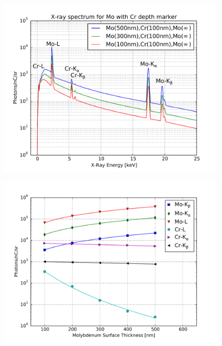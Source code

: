 \documentclass[12pt,letterpaper,final]{article}
\begin{document}
\begin{figure}[!h]
 \centering
  \includegraphics[width=\columnwidth]{figures//cModApplications/CrMarker_Spectra.pdf}
 \caption{}
 \label{fig:CrMarker_Spectra}
\end{figure}

\begin{figure}[!h]
 \centering
  \includegraphics[width=\columnwidth]{figures//cModApplications/CrMarker_IntensityLines.pdf}
 \caption{}
 \label{fig:CrMarker_IntensityLines}
\end{figure}





 
\end{document}
